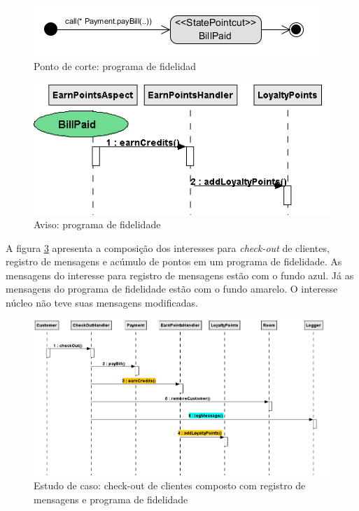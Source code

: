   \begin{figure}
	\centering
	\includegraphics{img/case_study_behavioral_pointcut_loyalty_points.png}
	\caption{Ponto de corte: programa de fidelidad}\label{fig:case_study_behavioral_pointcut_loyalty_points}
  \end{figure}

  \begin{figure}
	\centering
	\includegraphics{img/case_study_behavioral_loyalty_points.png}
	\caption{Aviso: programa de fidelidade}\label{fig:case_study_behavioral_loyalty_points}
  \end{figure}
  
A figura \ref{fig:case_study_2_compound} apresenta a composição dos interesses para \textit{check-out} de clientes, registro de mensagens e acúmulo
de pontos em um programa de fidelidade. As mensagens do interesse para registro de mensagens estão com o fundo azul. Já as mensagens do programa de
fidelidade estão com o fundo amarelo. O interesse núcleo não teve suas mensagens modificadas. 
  
  \begin{landscape}
  \begin{figure}[tb]
	\centering
	\includegraphics[scale=0.7]{img/case_study_2_compound.png}
	\caption{Estudo de caso: check-out de clientes composto com registro de mensagens e programa de fidelidade}\label{fig:case_study_2_compound}
  \end{figure}
\end{landscape}
  
